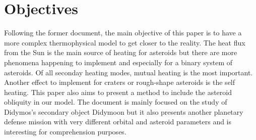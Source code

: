 \section{Objectives}
\label{sec:3}

Following the former document, the main objective of this paper is to have a more complex thermophysical model to get closer to the reality. The heat flux from the Sun is the main source of heating for asteroids but there are more phenomena happening to implement and especially for a binary system of asteroids. Of all seconday heating modes, mutual heating is the most important. Another effect to implement for craters or rough-shape asteroids is the self heating. This paper also aims to present a method to include the asteroid obliquity in our model. The document is mainly focused on the study of Didymos's secondary object Didymoon but it also presents another planetary defense mission with very different orbital and asteroid parameters and is interesting for comprehension purposes.
